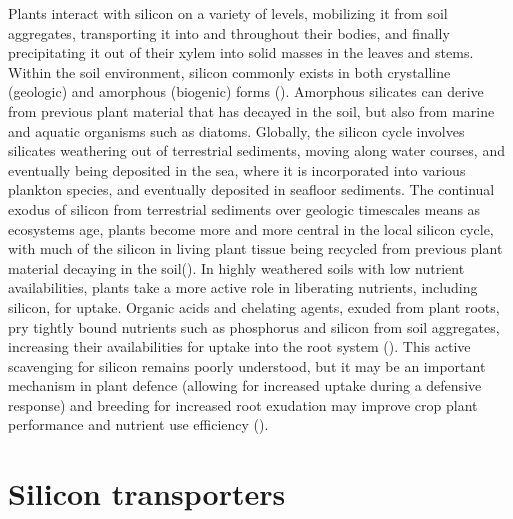 \documentclass[12pt, letterpaper, ]{report}
\begin{document}
Plants interact with silicon on a variety of levels, mobilizing it from soil aggregates, transporting it into and throughout their bodies, and finally precipitating it out of their xylem into solid masses in the leaves and stems. Within the soil environment, silicon commonly exists in both crystalline (geologic) and amorphous (biogenic) forms (\cite{haynes_contemporary_2014}). Amorphous silicates can derive from previous plant material that has decayed in the soil, but also from marine and aquatic organisms such as diatoms. Globally, the silicon cycle involves silicates weathering out of terrestrial sediments, moving along water courses, and eventually being deposited in the sea, where it is incorporated into various plankton species, and eventually deposited in seafloor sediments. The continual exodus of silicon from terrestrial sediments over geologic timescales means as ecosystems age, plants become more and more central in the local silicon cycle, with much of the silicon in living plant tissue being recycled from previous plant material decaying in the soil(\cite{de_tombeur_plants_2020}). In highly weathered soils with low nutrient availabilities, plants take a more active role in liberating nutrients, including silicon, for uptake. Organic acids and chelating agents, exuded from plant roots, pry tightly bound nutrients such as phosphorus and silicon from soil aggregates, increasing their availabilities for uptake into the root system (\cite{de_tombeur_silicon_2021-1}). This active scavenging for silicon remains poorly understood, but it may be an important mechanism in plant defence (allowing for increased uptake during a defensive response) and breeding for increased root exudation may improve crop plant performance and nutrient use efficiency (\cite{de_tombeur_silicon_2021}).

\section{Silicon transporters}	
\end{document}
